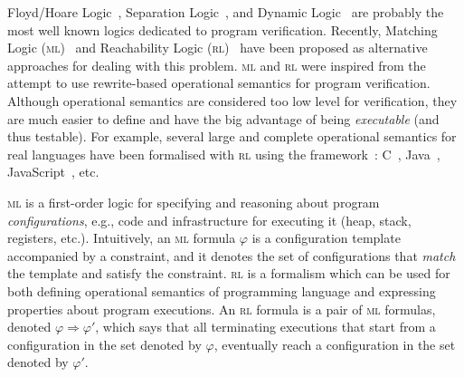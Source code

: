 \documentclass[conference]{IEEEtran}
\newcommand{\Ra}{\Rightarrow}
\newcommand{\ML}{\textsc{ml}\xspace}
\newcommand{\RL}{\textsc{rl}\xspace}
\newcommand{\rrule}[2]{{#1} \Ra{#2}}
\begin{document}
Floyd/Hoare Logic~\cite{Floyd1967Flowcharts,Hoare1969}, Separation Logic~\cite{OHearnP99,Reynolds02}, and Dynamic Logic~\cite{HarelKT01} are probably the most well known logics dedicated to program verification.
Recently, Matching Logic (\ML)~\cite{rosu-ellison-schulte-2010-amast, rosu-stefanescu-2011-nier-icse} and Reachability Logic (\RL)~\cite{rosu-stefanescu-2012-icalp,rosu-stefanescu-2012-oopsla, rosu-stefanescu-ciobaca-moore-2013-lics, stefanescu-ciobaca-mereuta-moore-serbanuta-rosu-2014-rta} have been proposed as alternative approaches for dealing with this problem. 
\ML and \RL were inspired from the attempt to use rewrite-based operational semantics for program verification.
Although operational semantics are considered too low level for verification, they are much easier to define and have the big advantage of being \emph{executable} (and thus testable). 
For example, several large and complete operational semantics for real languages have been formalised with \RL using the \K framework~\cite{rosu-serbanuta-2010-jlap, rosu-serbanuta-2013-k, serbanuta201457}: C~\cite{ellison-rosu-2012-popl,hathhorn-ellison-rosu-2015-pldi}, Java~\cite{bogdanas-rosu-2015-popl}, JavaScript~\cite{park-stefanescu-rosu-2015-pldi}, etc.

\ML is a first-order logic for specifying and reasoning about program \emph{configurations}, e.g., code and infrastructure for executing it (heap, stack, registers, etc.).
Intuitively, an \ML formula $\varphi$ is a configuration template accompanied by a constraint, and it denotes the set of configurations that \emph{match} the template and satisfy the constraint.
\RL is a formalism which can be used for both defining operational semantics of programming language and expressing properties about program executions. 
An \RL formula is a pair of \ML formulas, denoted $\rrule{\varphi}{\varphi'}$, which says that all terminating executions that start from a configuration in the set denoted by $\varphi$, eventually reach a configuration in the set denoted by $\varphi'$.
\end{document}
